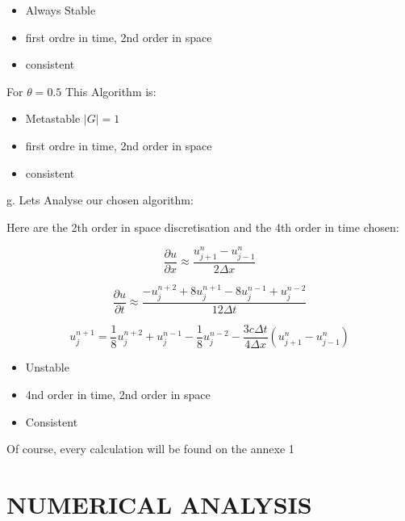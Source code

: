 \documentclass[12pt]{article}
\begin{document}
\begin{itemize}
    \item Always Stable
    \item first ordre in time, 2nd order in space
    \item consistent \\[1cm]
\end{itemize}

For $\theta = 0.5$ This Algorithm is:

\begin{itemize}
    \item Metastable $|G| = 1$
    \item first ordre in time, 2nd order in space
    \item consistent \\[1cm]
\end{itemize}

g. Lets Analyse our chosen algorithm:

Here are the 2th order in space discretisation and the 4th order in time chosen:

\begin{equation}
    \frac{\partial u}{\partial x} \approx \frac{u_{j+1}^n - u_{j-1}^n}{2 \Delta x}
\end{equation}

\begin{equation}
    \frac{\partial u}{\partial t} \approx \frac{- u_j^{n+2} + 8 u_j^{n+1} - 8 u_j^{n-1} + u_j^{n-2}}{12 \Delta t}
\end{equation}

\begin{equation}
    u_j^{n+1} = \frac{1}{8} u_j^{n+2} + u_{j}^{n-1} - \frac{1}{8} u_{j}^{n-2}
    -\frac{3c \Delta t}{4 \Delta x} \left( u_{j+1}^{n} - u_{j-1}^{n} \right)
\end{equation}

\begin{itemize}
    \item Unstable
    \item 4nd order in time, 2nd order in space
    \item Consistent \\[1cm]
\end{itemize}

Of course, every calculation will be found on the annexe 1

\newpage
\section{NUMERICAL ANALYSIS}
\end{document}
